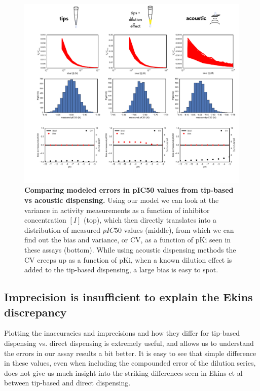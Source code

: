 \documentclass[aps,pre,twocolumn,nofootinbib,superscriptaddress,linenumbers]{revtex4-1}
\begin{document}
\begin{figure}[tb]
    \includegraphics[width=1.0\textwidth]{../figures/tips_v_acoustic.pdf}

  \caption{{\bf Comparing modeled errors in pIC50 values from tip-based vs acoustic dispensing.}
  Using our model we can look at the variance in activity measurements as a function of inhibitor concentration $[I]$ (top), which then directly translates into a distribution of measured $pIC50$ values (middle), from which we can find out the bias and variance, or CV, as a function of pKi seen in these assays (bottom). While using acoustic dispensing methods the CV creeps up as a function of pKi, when a known dilution effect is added to the tip-based dispensing, a large bias is easy to spot.
  }
  \label{fig:acoustic-vs-tips}
\end{figure}

\subsection*{Imprecision is insufficient to explain the Ekins discrepancy}

Plotting the inaccuracies and imprecisions and how they differ for tip-based dispensing vs. direct dispensing is extremely useful, and allows us to understand the errors in our assay results a bit better. 
It is easy to see that simple difference in these values, even when including the compounded error of the dilution series, does not give us much insight into the striking differences seen in Ekins et al between tip-based and direct dispensing.
\end{document}
